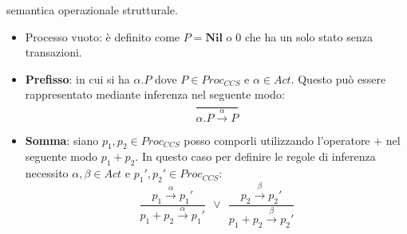 semantica operazionale strutturale.
\begin{itemize}
    \item Processo vuoto: è definito come $P = \textbf{Nil}$ o 0 che ha un solo
          stato senza transazioni.
          \begin{center}
          \end{center}
    \item \textbf{Prefisso}: in cui si ha $\alpha . P$ dove $P \in Proc_{CCS}$
          e $\alpha \in Act$. Questo può essere rappresentato mediante inferenza nel
          seguente modo:
          \begin{equation}
              \frac{}{\alpha . P \xrightarrow{\alpha} P}
          \end{equation}
          \begin{center}
          \end{center}
    \item \textbf{Somma}: siano $p_1, p_2 \in Proc_{CCS}$ posso comporli utilizzando
          l'operatore $+$ nel seguente modo $p_1 + p_2$. In questo caso per definire
          le regole di inferenza necessito $\alpha, \beta \in Act$ e
          $p_1', p_2' \in Proc_{CCS}$:
          \begin{equation}
              \frac{p_1 \xrightarrow{\alpha} p_1'}{p_1 + p_2
                  \xrightarrow{\alpha} p_1'}
              \ \ \lor \ \
              \frac{p_2 \xrightarrow{\beta} p_2'}{p_1 + p_2
                  \xrightarrow{\beta} p_2'}
          \end{equation}
          \begin{center}
\end{center}
\end{itemize}

